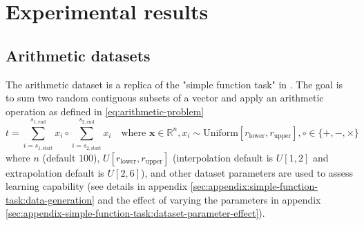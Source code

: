 \section{Experimental results}
\label{sec:experiments}

\subsection{Arithmetic datasets}
\label{sec:arithmetic-dataset}

The arithmetic dataset is a replica of the "simple function task" in \citet{trask-nalu}.
The goal is to sum two random contiguous subsets of a vector and apply an arithmetic operation as defined in \eqref{eq:arithmetic-problem}
\begin{equation}
t = \sum_{i = s_{1,\mathrm{start}}}^{s_{1,\mathrm{end}}} x_i \circ \sum_{i = s_{2,\mathrm{start}}}^{s_{2,\mathrm{end}}} x_i \quad \text{where } \mathbf{x} \in \mathbb{R}^n, x_i \sim \mathrm{Uniform}[r_{\mathrm{lower}}, r_{\mathrm{upper}}], \circ \in \{+, -, \times\}
\label{eq:arithmetic-problem}
\end{equation}
where $n$ (default $100$), $U[r_{\mathrm{lower}}, r_{\mathrm{upper}}]$ (interpolation default is $U[1,2]$ and extrapolation default is $U[2,6]$), and other dataset parameters are used to assess learning capability (see details in appendix \ref{sec:appendix:simple-function-task:data-generation} and the effect of varying the parameters in appendix \ref{sec:appendix-simple-function-task:dataset-parameter-effect}).

